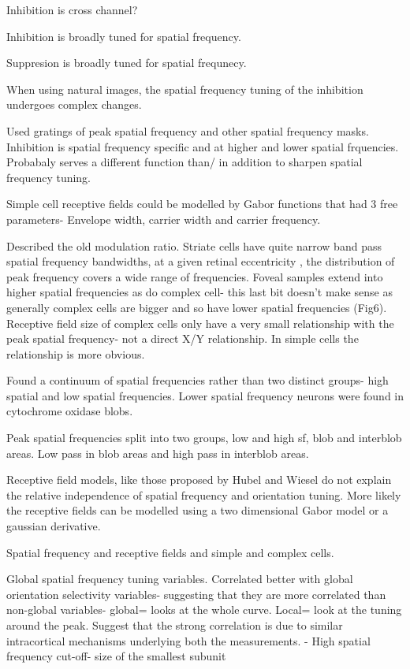 \documentclass {report}
\begin{document}
Inhibition is cross channel?

\cite{Morrone1982} Inhibition is broadly tuned for spatial frequency.

\cite{DeAngelis1992} Suppresion is broadly tuned for spatial frequnecy. 

\cite{David2004} When using natural images, the spatial frequency tuning of the inhibition undergoes complex changes.

\cite{DeValois1983} Used gratings of peak spatial frequency and other spatial frequency masks. Inhibition is spatial frequency specific and at higher and lower spatial frquencies. Probabaly serves a different function than/ in addition to sharpen spatial frequency tuning.


\cite{Field1986} Simple cell receptive fields could be modelled by Gabor functions that had 3 free parameters- Envelope width, carrier width and carrier frequency. 
	
	\cite{DeValois1982a} Described the old modulation ratio. Striate cells have quite narrow band pass spatial frequency bandwidths, at a given retinal eccentricity , the distribution of peak frequency covers a wide range of frequencies.  Foveal samples extend into higher spatial frequencies as do complex cell- this last bit doesn't make sense as generally complex cells are bigger and so have lower spatial frequencies (Fig6).
	Receptive field size of complex cells only have a very small relationship with the peak spatial frequency- not a direct X/Y relationship.
	In simple cells the relationship is more obvious. 
	
	\cite{Silverman1989} Found a continuum of spatial frequencies rather than two distinct groups- high spatial and low spatial frequencies. Lower spatial frequency neurons were found in cytochrome oxidase blobs.
	
	\cite{Born1991} Peak spatial frequencies split into two groups, low and high sf, blob and interblob areas. Low pass in blob areas and high pass in interblob areas.
	
	\cite{Webster1985} Receptive field models, like those proposed by Hubel and Wiesel do not explain the relative independence of spatial frequency and orientation tuning. More likely the receptive fields can be modelled using a two dimensional Gabor model or a gaussian derivative.
	
	Spatial frequency and receptive fields and simple and complex cells. 
	
\cite{Xing2004} Global spatial frequency tuning variables. Correlated better with global orientation selectivity variables- suggesting that they are more correlated than non-global variables- global= looks at the whole curve. Local= look at the tuning around the peak. Suggest that the strong correlation is due to similar intracortical mechanisms underlying both the measurements.
\cite{Parker1988}- High spatial frequency cut-off- size of the smallest subunit
\end{document}
